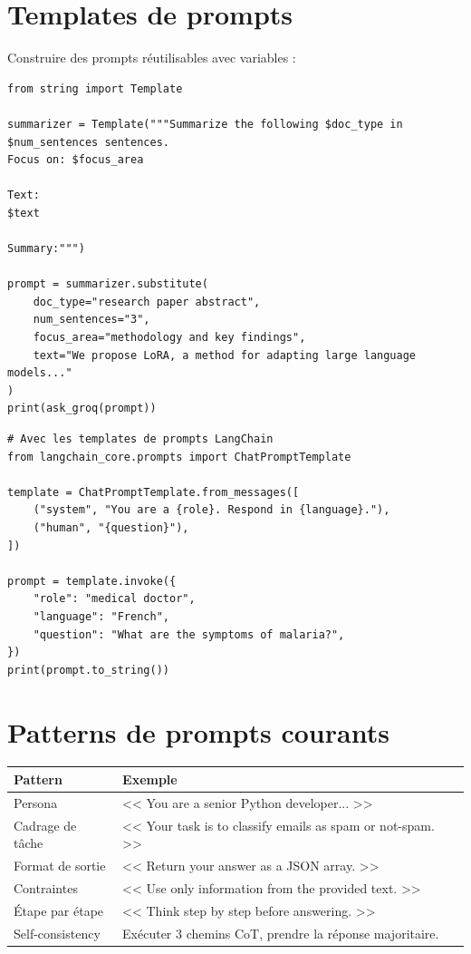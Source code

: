 \section{Templates de prompts}

Construire des prompts r\'eutilisables avec variables :

\begin{verbatim}
from string import Template

summarizer = Template("""Summarize the following $doc_type in $num_sentences sentences.
Focus on: $focus_area

Text:
$text

Summary:""")

prompt = summarizer.substitute(
    doc_type="research paper abstract",
    num_sentences="3",
    focus_area="methodology and key findings",
    text="We propose LoRA, a method for adapting large language models..."
)
print(ask_groq(prompt))
\end{verbatim}

\begin{verbatim}
# Avec les templates de prompts LangChain
from langchain_core.prompts import ChatPromptTemplate

template = ChatPromptTemplate.from_messages([
    ("system", "You are a {role}. Respond in {language}."),
    ("human", "{question}"),
])

prompt = template.invoke({
    "role": "medical doctor",
    "language": "French",
    "question": "What are the symptoms of malaria?",
})
print(prompt.to_string())
\end{verbatim}

\section{Patterns de prompts courants}

\begin{longtable}{p{3.5cm}p{9cm}}
\toprule
\textbf{Pattern} & \textbf{Exemple} \\
\midrule
Persona & << You are a senior Python developer... >> \\
Cadrage de t\^ache & << Your task is to classify emails as spam or not-spam. >> \\
Format de sortie & << Return your answer as a JSON array. >> \\
Contraintes & << Use only information from the provided text. >> \\
\'Etape par \'etape & << Think step by step before answering. >> \\
Self-consistency & Ex\'ecuter 3 chemins CoT, prendre la r\'eponse majoritaire. \\
\bottomrule
\end{longtable}


